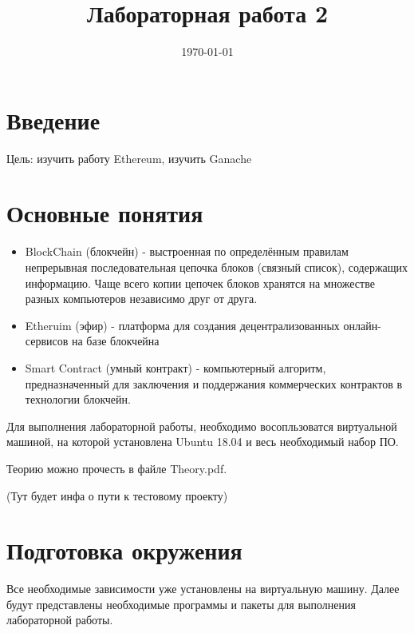 \documentclass{article}
\begin{document}
\title{Лабораторная работа 2}

\date{\today}
\maketitle


\section{Введение}

Цель: изучить работу Ethereum, изучить Ganache


\section{Основные понятия}

\begin{itemize}
	\item BlockChain (блокчейн) - выстроенная по определённым правилам непрерывная последовательная цепочка блоков (связный список), содержащих информацию. Чаще всего копии цепочек блоков хранятся на множестве разных компьютеров независимо друг от друга. 
	\item Etheruim (эфир) -  платформа для создания децентрализованных онлайн-сервисов на базе блокчейна
	\item Smart Contract (умный контракт) - компьютерный алгоритм, предназначенный для заключения и поддержания коммерческих контрактов в технологии блокчейн. 	
\end{itemize}


Для выполнения лабораторной работы, необходимо восопльзоватся виртуальной машиной, на которой установлена Ubuntu 18.04 и весь необходимый набор ПО.

Теорию можно прочесть в файле Theory.pdf.

(Тут будет инфа о пути к тестовому проекту)


\section{Подготовка окружения}

Все необходимые зависимости уже установлены на виртуальную машину. Далее будут представлены необходимые программы и пакеты для выполнения лабораторной работы. 
\end{document}
